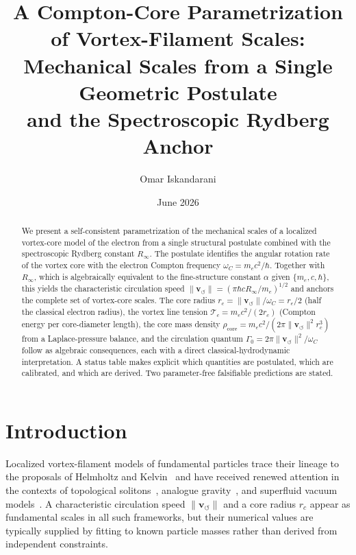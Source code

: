 \documentclass[aps,pra,preprint,longbibliography,nofootinbib]{revtex4-2}
\newcommand{\vnorm}{\lVert\mathbf{v}_{\!\boldsymbol{\circlearrowleft}}\rVert} %
\newcommand{\rhocore}{\rho_{\mathrm{core}}}      %
\newcommand{\rc}{r_c}                            %
\newcommand{\omC}{\omega_C}                      %
\newcommand{\Rinf}{R_\infty}                     %
\newcommand{\Tc}{\mathcal{T}_c}                  %
\newcommand{\Gz}{\Gamma_0}                       %
\begin{document}
\title{A Compton-Core Parametrization of Vortex-Filament Scales:\\
       Mechanical Scales from a Single Geometric Postulate\\
       and the Spectroscopic Rydberg Anchor}

\author{Omar Iskandarani}
\date{June 2026}

\begin{abstract}
We present a self-consistent parametrization of the mechanical scales
of a localized vortex-core model of the electron from a single
structural postulate combined with the spectroscopic Rydberg constant
$\Rinf$.
The postulate identifies the angular rotation rate of the vortex core
with the electron Compton frequency $\omC = m_e c^2/\hbar$.
Together with $\Rinf$, which is algebraically equivalent to the
fine-structure constant $\alpha$ given $\{m_e, c, \hbar\}$,
this yields the characteristic circulation speed
$\vnorm = (\pi\hbar c\Rinf/m_e)^{1/2}$
and anchors the complete set of vortex-core scales.
The core radius $\rc = \vnorm/\omC = r_e/2$ (half the classical
electron radius), the vortex line tension
$\Tc = m_e c^2/(2\rc)$ (Compton energy per core-diameter length),
the core mass density $\rhocore = m_e c^2/(2\pi\vnorm^2\rc^3)$
from a Laplace-pressure balance, and the circulation quantum
$\Gz = 2\pi\vnorm^2/\omC$ follow as algebraic consequences,
each with a direct classical-hydrodynamic interpretation.
A status table makes explicit which quantities are postulated,
which are calibrated, and which are derived.
Two parameter-free falsifiable predictions are stated.
\end{abstract}

\maketitle

\section{Introduction}
\label{sec:intro}

Localized vortex-filament models of fundamental particles trace their
lineage to the proposals of Helmholtz and
Kelvin~\cite{Helmholtz1867,Kelvin1867} and have received renewed
attention in the contexts of topological solitons~\cite{FaddeevNiemi1997},
analogue gravity~\cite{Barcelo2005}, and superfluid vacuum
models~\cite{Volovik2003}.
A characteristic circulation speed $\vnorm$ and a core radius $\rc$
appear as fundamental scales in all such frameworks, but their
numerical values are typically supplied by fitting to known particle
masses rather than derived from independent constraints.
\end{document}
